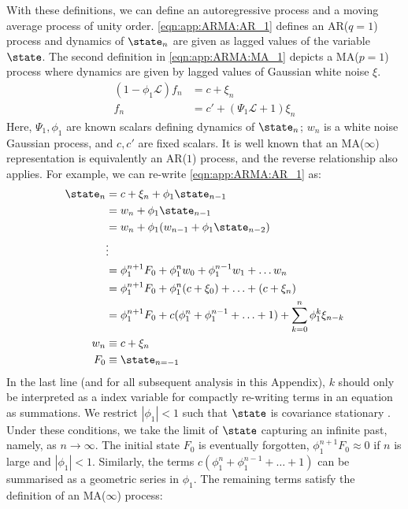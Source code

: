 With these definitions, we can define an autoregressive process and a moving average process of unity order.  \cref{eqn:app:ARMA:AR_1} defines an AR($q=1$) process and dynamics of $\state_n$ are given as lagged values of the variable $\state$. The second definition in \cref{eqn:app:ARMA:MA_1} depicts a MA($p = 1$) process where dynamics are given by lagged values of Gaussian white noise $\xi$. 
\begin{align}
(1 - \phi_1 \mathcal{L}) f_n  & = c + \xi_n  \label{eqn:app:ARMA:AR_1} \\
f_n & = c' + (\Psi_1 \mathcal{L} + 1)\xi_n  \label{eqn:app:ARMA:MA_1} 
\end{align}
Here, $\Psi_1, \phi_1$ are known scalars defining dynamics of $\state_n$; $w_n$ is a white noise Gaussian process, and $c, c'$ are fixed scalars. It is well known that an MA($\infty$) representation is equivalently an AR($1$) process, and the reverse relationship also applies. For example, we can re-write \cref{eqn:app:ARMA:AR_1} as:
\begin{align}
\state_n & = c + \xi_n + \phi_1 \state_{n-1} \\
& = w_n + \phi_1 \state_{n-1} \\
& = w_n + \phi_1 (w_{n-1}+ \phi_1 \state_{n-2} ) \\
& \vdots \\
& = \phi_1^{n+1} F_0 + \phi_1^{n} w_{0} + \phi_1^{n-1} w_{1} + \hdots w_n \\
& = \phi_1^{n+1} F_0 + \phi_1^{n} (c + \xi_{0}) + \hdots + (c + \xi_{n}) \\
& = \phi_1^{n+1} F_0 +  c (\phi_1^{n} + \phi_1^{n-1} + \hdots + 1) + \sum_{k=0}^{n} \phi_1^k \xi_{n-k} \\
w_n & \equiv c + \xi_n \\
F_0 & \equiv \state_{n=-1} 
\end{align} In the last line (and for all subsequent analysis in this Appendix),  $k$ should only be interpreted as a index variable for compactly re-writing terms in an equation as summations. We restrict $|\phi_1| < 1$ such that $\state$ is covariance stationary \cite{hamilton1994time}. %
Under these conditions, we take the limit of $\state$ capturing an infinite past, namely, as $n \to \infty$. The initial state $F_0$ is eventually forgotten, $\phi_1^{n+1} F_0 \approx 0$ if $n$ is large and $|\phi_1| < 1$. Similarly, the terms $c (\phi_1^{n} + \phi_1^{n-1} + \hdots + 1)$  can be summarised as a geometric series in $\phi_1$. The remaining terms satisfy the definition of an MA($\infty$) process:
